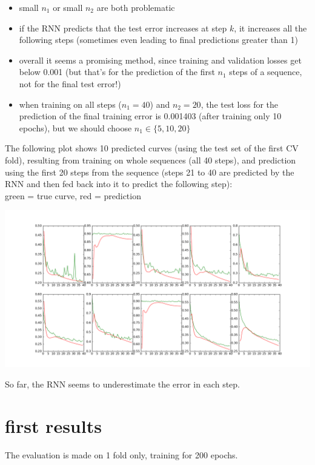\documentclass[a4paper,10pt]{article}
\begin{document}
\begin{itemize}
 \item small $n_1$ or small $n_2$ are both problematic
 \item if the RNN predicts that the test error increases at step $k$, it increases all the following steps (sometimes even leading to final predictions greater than 1)
 \item overall it seems a promising method, since training and validation losses get below 0.001 (but that's for the prediction of the first $n_1$ steps
  of a sequence, not for the final test error!)
 \item when training on all steps ($n_1 = 40$) and $n_2 = 20$, the test loss for the prediction of the final training error is 0.001403 (after training only 10 epochs),
  but we should choose $n_1 \in \{5, 10, 20\}$
\end{itemize}

The following plot shows 10 predicted curves (using the test set of the first CV fold), resulting from training on whole sequences (all 40 steps), and prediction using the first 20 steps
from the sequence (steps 21 to 40 are predicted by the RNN and then fed back into it to predict the following step):\\
green = true curve, red = prediction

\includegraphics[width=\textwidth]{../../figures/lstm_many2many_39train-steps_20pred-steps}

So far, the RNN seems to underestimate the error in each step.


\section{first results}

The evaluation is made on 1 fold only, training for 200 epochs.
\end{document}
